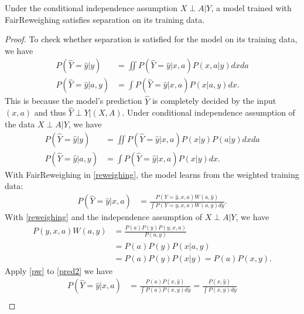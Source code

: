 \begin{proposition}
Under the conditional independence assumption $X\perp A|Y$, a model trained with FairReweighing satisfies separation on its training data. 
\end{proposition}
\begin{proof}
To check whether separation is satisfied for the model on its training data, we have
\begin{equation}
\label{psy}
\begin{aligned}
P(\hat{Y}=\hat{y} | y) &= \iint P(\hat{Y}=\hat{y} | x, a)P(x,a|y)dxda\\
P(\hat{Y}=\hat{y} | a, y) &= \int P(\hat{Y}=\hat{y} | x, a)P(x|a, y)dx.
\end{aligned}
\end{equation}
This is because the model's prediction $\hat{Y}$ is completely decided by the input $(x, a)$ and thus $\hat{Y}\perp Y | (X, A)$. Under conditional independence assumption of the data $X\perp A | Y$, we have
\begin{equation}
\label{psy2}
\begin{aligned}
P(\hat{Y}=\hat{y} | y) &= \iint P(\hat{Y}=\hat{y} | x, a)P(x|y)P(a|y) dxda\\
P(\hat{Y}=\hat{y} | a, y) &= \int P(\hat{Y}=\hat{y} | x, a)P(x|y) dx.
\end{aligned}
\end{equation}
With FairReweighing in \eqref{reweighing}, the model learns from the weighted training data:
\begin{equation}
\label{pred2}
\begin{aligned}
P(\hat{Y} = \hat{y} | x, a) &=  \frac{P(Y=\hat{y}, x, a)W(a,\hat{y})}{\int P(Y=y, x, a)W(a,y)dy}.
\end{aligned}
\end{equation}
With \eqref{reweighing} and the independence assumption of $X\perp A | Y$, we have
\begin{equation}
\label{pw}
\begin{aligned}
P(y, x, a)W(a,y) &= \frac{ P(a) P(y)P(y, x, a)}{P(a, y)}\\
&= P(a)P(y)P(x|a,y)\\
&= P(a)P(y)P(x|y)= P(a)P(x,y). 
\end{aligned}
\end{equation}
Apply \eqref{pw} to \eqref{pred2} we have
\begin{equation}
\label{pred3}
\begin{aligned}
P(\hat{Y} = \hat{y} | x, a) &= \frac{P(a)P(x,\hat{y})}{\int P(a)P(x,y) dy} = \frac{P(x,\hat{y})}{\int P(x,y) dy} \\

\end{aligned}
\end{equation}
\end{proof}
